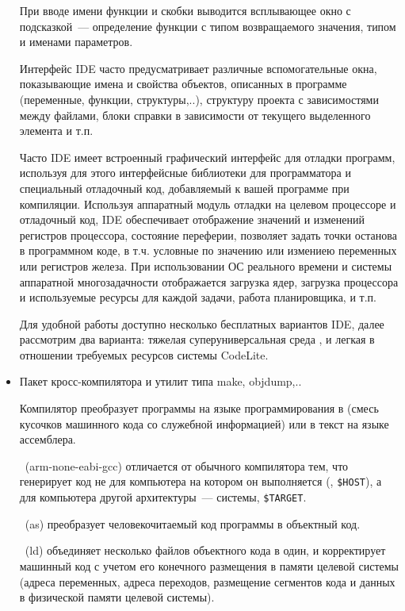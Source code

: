 \begin{itemize}
  При вводе имени функции и скобки выводится всплывающее окно с подсказкой\ ---
  определение функции с типом возвращаемого значения, типом и именами
  параметров.
  
  Интерфейс IDE часто предусматривает различные вспомогательные окна,
  показывающие имена и свойства объектов, описанных в программе (переменные,
  функции, структуры,..), структуру проекта с зависимостями между файлами, блоки
  справки в зависимости от текущего выделенного элемента и т.п.
  
  Часто IDE имеет встроенный графический интерфейс для отладки программ,
  используя для этого интерфейсные библиотеки для программатора и
  специальный отладочный код, добавляемый к вашей программе при
  компиляции. Используя аппаратный модуль отладки на целевом процессоре и
  отладочный код, IDE обеспечивает отображение значений и изменений регистров
  процессора, состояние переферии, позволяет задать точки останова в программном
  коде, в т.ч. условные по значению или измениею переменных или регистров
  железа.
  При использовании ОС реального времени и системы аппаратной многозадачности
  отображается загрузка ядер, загрузка процессора и используемые ресурсы для
  каждой задачи, работа планировщика, и т.п.
  
Для удобной работы доступно несколько бесплатных вариантов IDE, далее
рассмотрим два варианта: тяжелая суперуниверсальная среда \eclipse, и легкая 
в отношении требуемых ресурсов системы CodeLite.
  
  \item Пакет кросс-компилятора и утилит типа make, objdump,..
  
  Компилятор преобразует программы на языке программирования в  (смесь кусочков машинного кода со служебной информацией) или в
  текст на языке ассемблера.
  
  \ (arm-none-eabi-gcc) отличается от обычного
  компилятора тем, что генерирует код не для компьютера на котором он выполняется
  (, \verb|$HOST|), а для компьютера другой
  архитектуры\ ---  системы, \verb|$TARGET|.
  
  \ (as) преобразует человекочитаемый код программы в объектный
  код.
  
  \ (ld) объединяет несколько файлов объектного кода в один,
  и корректирует машинный код с учетом его конечного размещения в памяти
  целевой системы (адреса переменных, адреса переходов, размещение сегментов
  кода и данных в физической памяти целевой системы).
  

\end{itemize}
